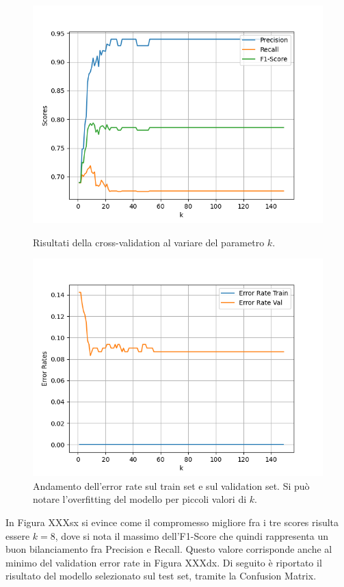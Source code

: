 \documentclass[a4paper,9pt]{article}
\begin{document}
\begin{figure}[H]
  \centering
  \begin{minipage}{.45\textwidth}
    \centering
    \includegraphics[width=\textwidth]{Gridsearch60distance.png}
    \caption{Risultati della cross-validation al variare del parametro $k$.}
  \end{minipage}
  \begin{minipage}{.45\textwidth}
    \centering
    \includegraphics[width=\textwidth]{Overfitting60distance.png}
    \caption{Andamento dell'error rate sul train set e sul validation set. Si può notare l'overfitting del modello per piccoli valori di $k$.}
  \end{minipage}
  \end{figure}
In Figura XXXsx si evince come il compromesso migliore fra i tre scores risulta essere $k=8$, dove si nota il massimo dell'F1-Score che quindi rappresenta un buon bilanciamento fra Precision e Recall. Questo valore corrisponde anche al minimo del validation error rate in Figura XXXdx.
Di seguito è riportato il risultato del modello selezionato sul test set, tramite la Confusion Matrix.\\
\end{document}
